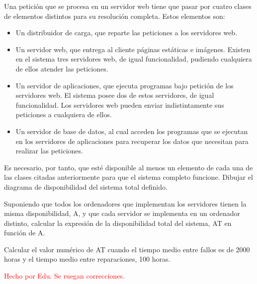 \begin{problem}[7]
Una petición que se procesa en un servidor web tiene que pasar por cuatro clases de elementos distintos para su resolución completa. Estos elementos son:
\begin{itemize}
	\item Un distribuidor de carga, que reparte las peticiones a los servidores web.
	\item Un servidor web, que entrega al cliente páginas estáticas e imágenes. Existen en el sistema tres servidores web, de igual funcionalidad, pudiendo cualquiera de ellos atender las peticiones.
	\item Un servidor de aplicaciones, que ejecuta programas bajo petición de los servidores web. El sistema posee dos de estos servidores, de igual funcionalidad. Los servidores web pueden enviar indistintamente sus peticiones a cualquiera de ellos.
	\item Un servidor de base de datos, al cual acceden los programas que se ejecutan en los servidores de aplicaciones para recuperar los datos que necesitan para realizar las peticiones.
\end{itemize}

Es necesario, por tanto, que esté disponible al menos un elemento de cada una de las clases citadas anteriormente para que el sistema completo funcione.
\ppart
Dibujar el diagrama de disponibilidad del sistema total definido.

\ppart
Suponiendo que todos los ordenadores que implementan los servidores tienen la misma disponibilidad, A, y que cada servidor se implementa en un ordenador distinto, calcular la expresión de la disponibilidad total del sistema, AT en función de A.

\ppart
Calcular el valor numérico de AT cuando el tiempo medio entre fallos es de 2000 horas y el tiempo medio entre reparaciones, 100 horas.

\solution
\textcolor{red}{Hecho por Edu. Se ruegan correcciones.}\\


\end{problem}
